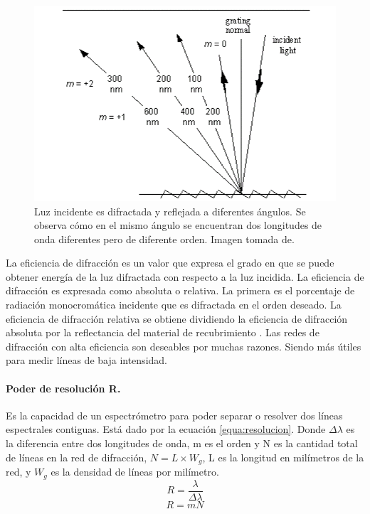 \begin{figure}[h]
	\centering
	\includegraphics[width=0.7\linewidth]{Imagenes/2/ordenes}
	\caption[Difracción de la luz se aprecia el orden de difracción de diferentes longitudes de onda.]{Luz incidente es difractada y reflejada a diferentes ángulos. Se observa cómo en el mismo ángulo se encuentran dos longitudes de onda diferentes pero de diferente orden. Imagen tomada de. \cite{Palmer2005}}
	\label{fig:ordenes}
\end{figure}


La eficiencia de difracción es un valor que expresa el grado en que se puede obtener energía de la luz difractada con respecto a la luz incidida.
La eficiencia de difracción es expresada como absoluta o relativa. La primera es el porcentaje de radiación monocromática incidente que es difractada en el orden deseado. La eficiencia de difracción relativa se obtiene dividiendo la eficiencia de difracción absoluta por la reflectancia del material de recubrimiento \cite{Shimadzu}.
Las redes de difracción con alta eficiencia son deseables por muchas razones. Siendo más útiles para medir líneas de baja intensidad. \cite{Palmer2005}

\paragraph{Poder de resolución R.} 
Es la capacidad de un espectrómetro para poder separar o resolver dos líneas espectrales contiguas. Está dado por la ecuación \ref{equa:resolucion}. Donde $\Delta\lambda$ es la diferencia entre dos longitudes de onda, m es el orden y N es la cantidad total de líneas en la red de difracción, $N= L\times W_g$, L es la longitud en milímetros de la red, y $W_g$ es la densidad de líneas por milímetro.
\begin{equation}
	R = \frac{\lambda}{\Delta \lambda}
	\label{equa:resolucion}
\end{equation}
\begin{equation}
	R = mN
	\label{equa:resolucion2}
\end{equation}

